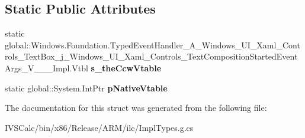 \subsection*{Static Public Attributes}
\begin{DoxyCompactItemize}
\item 
\mbox{\label{struct_windows_1_1_foundation_1_1_typed_event_handler___a___windows___u_i___xaml___controls___tecddfdbbe1975f56736362b195b332de6_a3463157810527eee011baf96c1ea75c9}} 
static global\+::\+Windows.\+Foundation.\+Typed\+Event\+Handler\+\_\+\+A\+\_\+\+Windows\+\_\+\+U\+I\+\_\+\+Xaml\+\_\+\+Controls\+\_\+\+Text\+Box\+\_\+j\+\_\+\+Windows\+\_\+\+U\+I\+\_\+\+Xaml\+\_\+\+Controls\+\_\+\+Text\+Composition\+Started\+Event\+Args\+\_\+\+V\+\_\+\+\_\+\+\_\+\+Impl.\+Vtbl {\bfseries s\+\_\+the\+Ccw\+Vtable}
\item 
\mbox{\label{struct_windows_1_1_foundation_1_1_typed_event_handler___a___windows___u_i___xaml___controls___tecddfdbbe1975f56736362b195b332de6_a2e5353e451ce622e15ec4a80a5a011bb}} 
static global\+::\+System.\+Int\+Ptr {\bfseries p\+Native\+Vtable}
\end{DoxyCompactItemize}


The documentation for this struct was generated from the following file\+:\begin{DoxyCompactItemize}
\item 
I\+V\+S\+Calc/bin/x86/\+Release/\+A\+R\+M/ilc/Impl\+Types.\+g.\+cs\end{DoxyCompactItemize}
